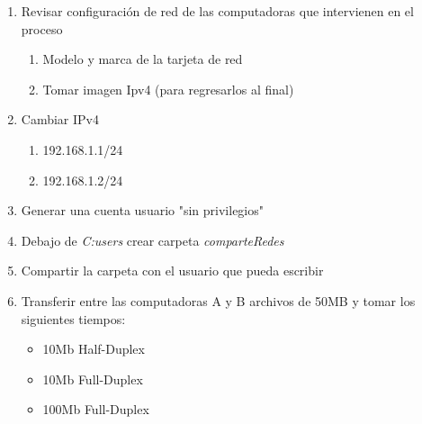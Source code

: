 \documentclass[]{article}
\begin{document}
\begin{enumerate}
	\item Revisar configuración de red de las
		computadoras que intervienen en el
		proceso
	\begin{enumerate}
		\item Modelo y marca de la tarjeta
			de red
		\item Tomar imagen Ipv4 (para
			regresarlos al final)
	\end{enumerate}
	\item Cambiar IPv4
	\begin{enumerate}
		\item 192.168.1.1/24
		\item 192.168.1.2/24
	\end{enumerate}
	\item Generar una cuenta usuario
		"sin privilegios"
	\item Debajo de \textit{C:users}
		crear carpeta \textit{comparteRedes}
	\item Compartir la carpeta con el usuario
		que pueda escribir
	\item Transferir entre las computadoras
		A y B archivos de 50MB
		y tomar los siguientes tiempos:
	\begin{itemize}
		\item 10Mb Half-Duplex
		\item 10Mb Full-Duplex
		\item 100Mb Full-Duplex
	\end{itemize}
\end{enumerate}
\end{document}
